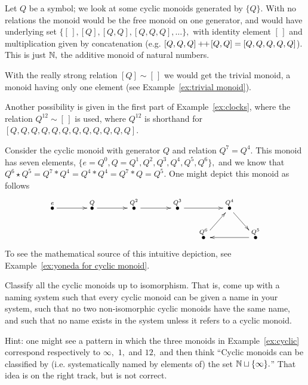 \documentclass[CT4S-EN-RU]{subfiles}
\begin{document}
\begin{exampleENG}\label{ex:cyclic}
Let $Q$ be a symbol; we look at some cyclic monoids generated by $\{Q\}.$ With no relations the monoid would be the free monoid on one generator, and would have underlying set $\{[\,],[Q],[Q,Q],[Q,Q,Q],\ldots\},$ with identity element $[\,]$ and multiplication given by concatenation (e.g. $[Q,Q,Q]+\!\!+\hspace{1pt}[Q,Q]=[Q,Q,Q,Q,Q]$). This is just ${\mathbb N},$ the additive monoid of natural numbers.

With the really strong relation $[Q]\sim[\,]$ we would get the trivial monoid, a monoid having only one element (see Example~\ref{ex:trivial monoid}).

Another possibility is given in the first part of Example~\ref{ex:clocks}, where the relation $Q^{12}\sim[\,]$ is used, where $Q^{12}$ is shorthand for $[Q,Q,Q,Q,Q,Q,Q,Q,Q,Q,Q,Q].$
\end{exampleENG}

\begin{exampleRUS}\label{ex:cyclic}
\end{exampleRUS}

\begin{exampleENG}\label{ex:cyclic monoid (7,4)}
Consider the cyclic monoid with generator $Q$ and relation $Q^7=Q^4.$ This monoid has seven elements, $\{e=Q^0,Q=Q^1, Q^2, Q^3, Q^4, Q^5, Q^6\},$ and we know that $Q^6\star Q^5=Q^7*Q^4=Q^4*Q^4=Q^7*Q=Q^5.$ One might depict this monoid as follows
$$\xymatrix@=15pt{
\LMO{e}\ar[rr]&&\LMO{Q}\ar[rr]&&\LMO{Q^2}\ar[rr]&&\LMO{Q^3}\ar[rr]&&\LMO{Q^4}\ar[dr]\\
&&&&&&&\LMO{Q^6}\ar[ur]&&\LMO{Q^5}\ar[ll]
}
$$
To see the mathematical source of this intuitive depiction, see Example~\ref{ex:yoneda for cyclic monoid}.
\end{exampleENG}

\begin{exampleRUS}\label{ex:cyclic monoid (7,4)}
\end{exampleRUS}

\begin{exerciseENG}\label{exc:classify cyclic}
Classify all the cyclic monoids up to isomorphism. That is, come up with a naming system such that every cyclic monoid can be given a name in your system, such that no two non-isomorphic cyclic monoids have the same name, and such that no name exists in the system unless it refers to a cyclic monoid.

Hint: one might see a pattern in which the three monoids in Example~\ref{ex:cyclic} correspond respectively to $\infty,$ $1,$ and $12,$ and then think “Cyclic monoids can be classified by (i.e. systematically named by elements of) the set ${\mathbb N}\sqcup\{\infty\}.$” That idea is on the right track, but is not correct.
\end{exerciseENG}
\end{document}

